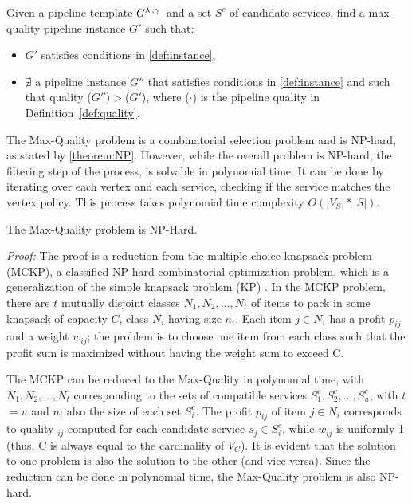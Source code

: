 \begin{definition}\label{def:MaXQualityInstance}
Given a pipeline template $G^{\lambda\,,\gamma\,}$ and a set $S^c$ of candidate services, find a max-quality pipeline instance $G'$ such that:
  \begin{itemize}
    \item $G'$ satisfies conditions in \cref{def:instance},
    \item $\nexists$ a pipeline instance $G''$ that satisfies conditions in \cref{def:instance} and such that quality \q($G''$)$>$\q($G'$), where \q($\cdot$) is the pipeline quality in Definition~\ref{def:quality}.
  \end{itemize}
\end{definition}

\vspace{0.5em}

The Max-Quality problem is a combinatorial selection problem and is NP-hard, as stated by \cref{theorem:NP}. However, while the overall problem is NP-hard, the filtering step of the process, is solvable in polynomial time. 
It can be done by iterating over each vertex and each service, checking if the service matches the vertex policy. This process takes polynomial time complexity $O(|V_S|*|S|)$.

\vspace{0.5em}

\begin{theorem}\label{theorem:NP}
  The Max-Quality problem is NP-Hard.
\end{theorem}
\emph{Proof: }
The proof is a reduction from the multiple-choice knapsack problem (MCKP), a classified NP-hard combinatorial optimization problem, which is a generalization of the simple knapsack problem (KP) \cite{Kellerer2004}. In the MCKP problem, there are $t$ mutually disjoint classes $N_1,N_2,\ldots,N_t$ of items to pack in some knapsack of capacity $C$, class $N_i$ having size $n_i$. Each item $j$$\in$$N_i$ has a profit $p_{ij}$ and a weight $w_{ij}$; the problem is to choose one item from each class such that the profit sum is maximized without having the weight sum to exceed C.

The MCKP can be reduced to the Max-Quality \problem in polynomial time, with $N_1,N_2,\ldots,N_t$ corresponding to the sets of compatible services $S^c_{1}, S^c_{2}, \ldots, S^c_{u}$, with $t$$=$$u$ and $n_i$ also the size of each set $S^c_{i}$. The profit $p_{ij}$ of item $j$$\in$$N_i$ corresponds to quality \textit{\q}$_{ij}$ computed for each candidate service $s_j$$\in$$S^c_{i}$, while $w_{ij}$ is uniformly 1 (thus, C is always equal to the cardinality of $V_C$). It is evident that the solution to one problem is also the solution to the other (and vice versa). Since the reduction can be done in polynomial time, the Max-Quality problem is also NP-hard. 

